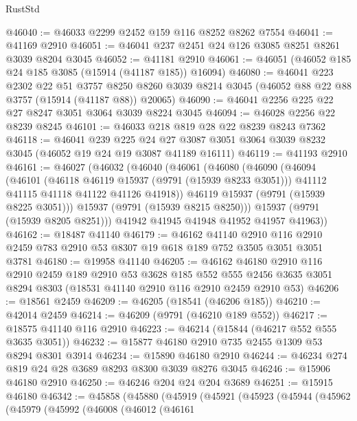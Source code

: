 \begin{lexlean}{RustStd}
\begin{coremodule}
@46040 := @46033 @2299 @2452 @159 @116 @8252 @8262 @7554
@46041 := @41169 @2910
@46051 := @46041 @237 @2451 @24 @126 @3085 @8251 @8261 @3039 @8204 @3045
@46052 := @41181 @2910
@46061 := @46051 (@46052 @185 @24 @185 @3085 (@15914 (@41187 @185)) @16094)
@46080 := @46041
    @223
    @2302
    @22
    @51
    @3757
    @8250
    @8260
    @3039
    @8214
    @3045
    (@46052 @88 @22 @88 @3757 (@15914 (@41187 @88)) @20065)
@46090 := @46041 @2256 @225 @22 @27 @8247 @3051 @3064 @3039 @8224 @3045
@46094 := @46028 @2256 @22 @8239 @8245
@46101 := @46033 @218 @819 @28 @22 @8239 @8243 @7362
@46118 := @46041
    @239
    @225
    @24
    @27
    @3087
    @3051
    @3064
    @3039
    @8232
    @3045
    (@46052 @19 @24 @19 @3087 @41189 @16111)
@46119 := @41193 @2910
@46161 := @46027
    (@46032
      (@46040
        (@46061
          (@46080
            (@46090
              (@46094
                (@46101
                  (@46118 @46119 @15937 (@9791 (@15939 @8233 @3051)))
                  @41112
                  @41115
                  @41118
                  @41122
                  @41126
                  @41918))
              @46119
              @15937
              (@9791 (@15939 @8225 @3051)))
            @15937
            (@9791 (@15939 @8215 @8250)))
          @15937
          (@9791 (@15939 @8205 @8251)))
        @41942
        @41945
        @41948
        @41952
        @41957
        @41963))
@46162 := @18487 @41140
@46179 := @46162
    @41140
    @2910
    @116
    @2910
    @2459
    @783
    @2910
    @53
    @8307
    @19
    @618
    @189
    @752
    @3505
    @3051
    @3051
    @3781
@46180 := @19958 @41140
@46205 := @46162
    @46180
    @2910
    @116
    @2910
    @2459
    @189
    @2910
    @53
    @3628
    @185
    @552
    @555
    @2456
    @3635
    @3051
    @8294
    @8303
    (@18531 @41140 @2910 @116 @2910 @2459 @2910 @53)
@46206 := @18561 @2459
@46209 := @46205 (@18541 (@46206 @185))
@46210 := @42014 @2459
@46214 := @46209 (@9791 (@46210 @189 @552))
@46217 := @18575 @41140 @116 @2910
@46223 := @46214 (@15844 (@46217 @552 @555 @3635 @3051))
@46232 := @15877 @46180 @2910 @735 @2455 @1309 @53 @8294 @8301 @3914
@46234 := @15890 @46180 @2910
@46244 := @46234 @274 @819 @24 @28 @3689 @8293 @8300 @3039 @8276 @3045
@46246 := @15906 @46180 @2910
@46250 := @46246 @204 @24 @204 @3689
@46251 := @15915 @46180
@46342 := @45858
    (@45880
      (@45919
        (@45921
          (@45923
            (@45944
              (@45962
                (@45979
                  (@45992
                    (@46008
                      (@46012
                        (@46161

\end{coremodule}
\end{lexlean}
